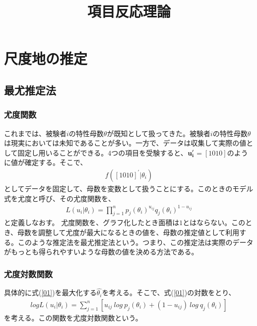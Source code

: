 \documentclass[12pt]{jarticle}
\title{項目反応理論}
\begin{document}
\maketitle
\section{尺度地の推定}
\subsection{最尤推定法}
\subsubsection{尤度関数}
これまでは、被験者$i$の特性母数$\theta$が既知として扱ってきた。被験者$i$の特性母数$\theta$は現実においては未知であることが多い。一方で、データは収集して実際の値として固定し用いることができる。$4$つの項目を受験すると、$\displaystyle \bf u_i^{\prime}$$=[1010]$のように値が確定する。そこで、
\begin{eqnarray}
  \label{00}
  \displaystyle f([1010]^{\prime}|\theta_i)
\end{eqnarray}
としてデータを固定して、母数を変数として扱うことにする。このときのモデル式を尤度と呼び、その尤度関数を、
\begin{eqnarray}
  \label{01}
  \displaystyle L(u_{i}|\theta_i) =\prod_{j = 1}^{n} p_{j}(\theta_i)^{u_{ij}} q_{j}(\theta_i)^{1 - u_{ij}}
\end{eqnarray}
と定義しなおす。
尤度関数を、グラフ化したとき面積は$1$とはならない。このとき、母数を調整して尤度が最大になるときの値を、母数の推定値として利用する。このような推定法を最尤推定法という。つまり、この推定法は実際のデータがもっとも得られやすいような母数の値を決める方法である。
\subsubsection{尤度対数関数}
具体的に式(\ref{01})を最大化する$\hat{\theta_i}$を考える。そこで、式(\ref{01})の対数をとり、
\begin{eqnarray}
  \label{02}
  \displaystyle log L(u_{i}|\theta_i) =\sum_{j = 1}^{n} [u_{ij} \  log \  p_{j}(\theta_i) + (1 - u_{ij}) \ log \  q_{j}(\theta_i)]
\end{eqnarray}
を考える。この関数を尤度対数関数という。
\end{document}
